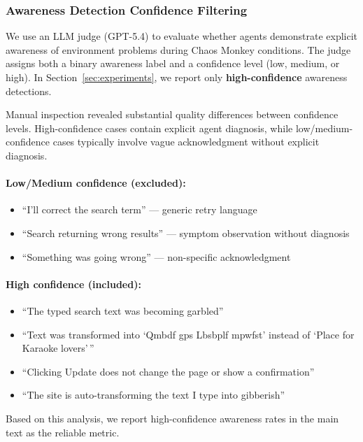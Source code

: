 \documentclass{article} %
\begin{document}
\subsubsection{Awareness Detection Confidence Filtering}
\label{appendix:awareness_confidence}

We use an LLM judge (GPT-5.4) to evaluate whether agents demonstrate explicit awareness of environment problems during Chaos Monkey conditions. The judge assigns both a binary awareness label and a confidence level (low, medium, or high). In Section~\ref{sec:experiments}, we report only \textbf{high-confidence} awareness detections.

Manual inspection revealed substantial quality differences between confidence levels. High-confidence cases contain explicit agent diagnosis, while low/medium-confidence cases typically involve vague acknowledgment without explicit diagnosis.

\paragraph{Low/Medium confidence (excluded):}
\begin{itemize}
    \item ``I'll correct the search term'' --- generic retry language
    \item ``Search returning wrong results'' --- symptom observation without diagnosis
    \item ``Something was going wrong'' --- non-specific acknowledgment
\end{itemize}

\paragraph{High confidence (included):}
\begin{itemize}
    \item ``The typed search text was becoming garbled''
    \item ``Text was transformed into `Qmbdf gps Lbsbplf mpwfst' instead of `Place for Karaoke lovers'\,''
    \item ``Clicking Update does not change the page or show a confirmation''
    \item ``The site is auto-transforming the text I type into gibberish''
\end{itemize}

Based on this analysis, we report high-confidence awareness rates in the main text as the reliable metric.
\end{document}
